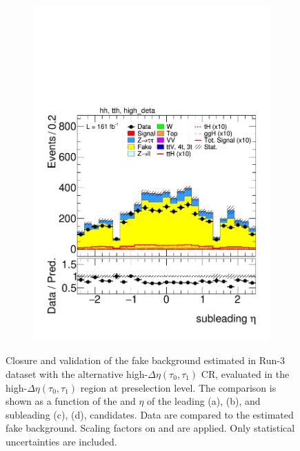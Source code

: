 \begin{figure}[htbp]
\begin{subfigure}[b]{0.45\textwidth}
        \includegraphics[width=\textwidth]{images/highdeta_highdeta_run3/plot_tau_1_eta_hh_tth_22_23_24_high_deta.pdf}
        \caption{}
      \end{subfigure}
      \caption{
    Closure and validation of the fake \tauhad background estimated in Run-3 dataset with the alternative high-$\Delta \eta (\tau_0, \tau_1)$ \tauhadhad CR, evaluated in the high-$\Delta \eta (\tau_0, \tau_1)$ region at preselection level.
    The comparison is shown as a function of the \pt and $\eta$ of the leading (a), (b), and subleading (c), (d), \tauhad candidates. 
    Data are compared to the estimated fake \tauhad background. Scaling factors on \ztautau and \ttbar are applied. Only statistical uncertainties are included.
  }
  \label{fig:closure_validation_highdeta_run3}
\end{figure}
      

